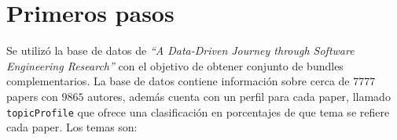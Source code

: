 \section{Primeros pasos}
{\begin{small}%
\begin{flushright}%
\it
\end{flushright}%
\end{small}%
\vspace{.5cm}}
Se utilizó la base de datos de \textit{\textquotedblleft A Data-Driven Journey through Software 
Engineering Research\textquotedblright} con el objetivo de obtener conjunto de bundles 
complementarios. La base de datos contiene información sobre cerca de $7777$ papers con $9865$ 
autores, además cuenta con un perfil para cada paper, llamado \texttt{topicProfile} que ofrece una 
clasificación en porcentajes de que tema se refiere cada paper. Los temas son:
